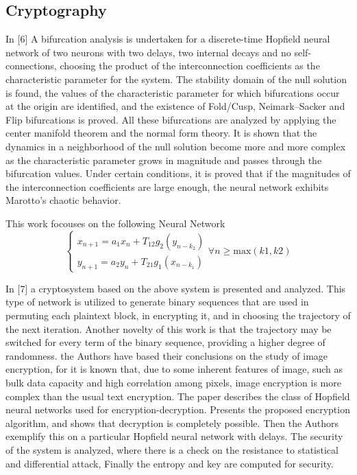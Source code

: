 \documentclass[12pt, letterpaper]{article}
\begin{document}
\subsection*{Cryptography}
In [6] A bifurcation analysis is undertaken for a discrete-time Hopfield neural network of two neurons with two delays, two internal decays and no self-connections, choosing the product of the interconnection coefficients as the characteristic parameter for the system. The stability domain of the null solution is found, the values of the characteristic parameter for which bifurcations occur at the origin are identified, and the existence of Fold/Cusp, Neimark–Sacker and Flip bifurcations is proved. All these bifurcations are analyzed by applying the center manifold theorem and the normal form theory. It is shown that the dynamics in a neighborhood of the null solution become more and more complex as the characteristic parameter grows in magnitude and passes through the bifurcation values. Under certain conditions, it is proved that if the magnitudes of the interconnection coefficients are large enough, the neural network exhibits Marotto’s chaotic behavior.

This work focouses on the following Neural Network
\[\begin{cases}
x_{n+1} = a_{1}x_{n} + T_{12}g_{2}(y_{n - k_{2}})\\
y_{n+1} = a_{2}y_{n} + T_{21}g_{1}(x_{n - k_{1}})
\end{cases} \forall n \geq \text{max}(k1, k2)\]

In [7] a cryptosystem based on the above system is presented and analyzed. This type of network is utilized to generate binary sequences that are used in permuting each plaintext block, in encrypting it, and in choosing the trajectory of the next iteration. Another novelty of this work is that the trajectory may be switched for every term of the binary sequence, providing a higher degree of randomness. the Authors have based their conclusions on the study of image encryption, for it is known that, due to some inherent features of image, such as bulk data capacity and high correlation among pixels, image encryption is more complex than
the usual text encryption. The paper describes the class of Hopfield neural networks
used for encryption-decryption. Presents the proposed encryption algorithm, and shows
that decryption is completely possible. Then the Authors exemplify this on a particular Hopfield neural network with delays. The security of the system is analyzed, where there is a check on the resistance to statistical and differential attack, Finally the entropy and key are computed for
security.
\end{document}
